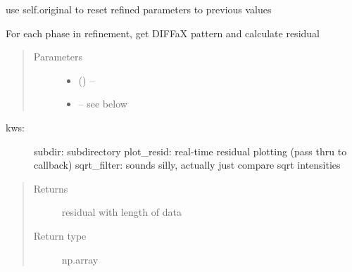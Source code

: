\documentclass[letterpaper,10pt,english]{sphinxmanual}
\begin{document}
\begin{fulllineitems}
\begin{fulllineitems}
\end{fulllineitems}


\begin{fulllineitems}
\label{\detokenize{rst/pairdistributionfunction:mstack.pairdistributionfunction.PdfRefinement.reset}}
use self.original to reset refined parameters to previous values

\end{fulllineitems}


\begin{fulllineitems}
\label{\detokenize{rst/pairdistributionfunction:mstack.pairdistributionfunction.PdfRefinement.residual_method}}
For each phase in refinement, get DIFFaX pattern and calculate residual
\begin{quote}\begin{description}
\item[{Parameters}] \leavevmode\begin{itemize}
\item {} 
 () -- 

\item {} 
 -- see below

\end{itemize}

\end{description}\end{quote}
\begin{description}
\item[{kws:}] \leavevmode
subdir: subdirectory
plot\_resid: real-time residual plotting (pass thru to callback)
sqrt\_filter: sounds silly, actually just compare sqrt intensities

\end{description}
\begin{quote}\begin{description}
\item[{Returns}] \leavevmode
residual with length of data

\item[{Return type}] \leavevmode
np.array


\end{description}
\end{quote}
\end{fulllineitems}
\end{fulllineitems}
\end{document}
